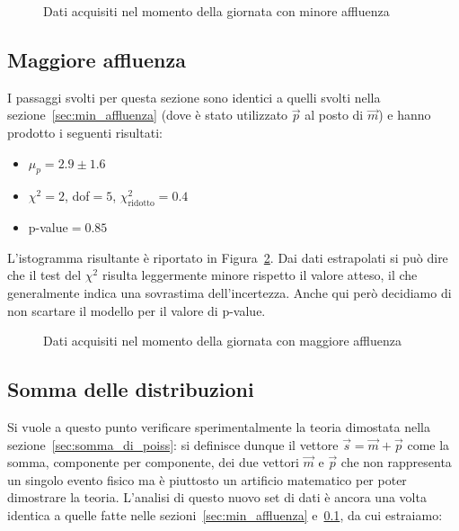 \documentclass[a4paper,12pt]{article}
\begin{document}
\begin{figure}
    \centering
    \sffamily
    \resizebox{0.85\textwidth}{!}{%
        
    }
    \caption{Dati acquisiti nel momento della giornata con minore affluenza}%
    \label{fig:set1}
\end{figure}

\subsection{Maggiore affluenza}\label{sec:max_affluenza}

I passaggi svolti per questa sezione sono identici a quelli svolti nella sezione~\ref{sec:min_affluenza} (dove è stato utilizzato $\vec{p}$ al posto di $\vec{m}$) e hanno prodotto i seguenti risultati:

\begin{itemize}
    \item $\mu_p = 2.9 \pm 1.6$
    \item $\chi^2 = 2$, dof$=5$, $\chi^2_\text{ridotto} = 0.4$
    \item p-value$=0.85$
\end{itemize}

L'istogramma risultante è riportato in Figura~\ref{fig:set2}. Dai dati estrapolati si può dire che il test del $\chi^2$ risulta leggermente minore rispetto il valore atteso, il che generalmente indica una sovrastima dell'incertezza. Anche qui però decidiamo di non scartare il modello per il valore di p-value.

\begin{figure}
    \centering
    \sffamily
    \resizebox{0.85\textwidth}{!}{%
        
    }
    \caption{Dati acquisiti nel momento della giornata con maggiore affluenza}%
    \label{fig:set2}
\end{figure}

\subsection{Somma delle distribuzioni}

Si vuole a questo punto verificare sperimentalmente la teoria dimostata nella sezione~\ref{sec:somma_di_poiss}: si definisce dunque il vettore $\vec{s} = \vec{m} + \vec{p}$ come la somma, componente per componente, dei due vettori $\vec{m}$ e $\vec{p}$ che non rappresenta un singolo evento fisico ma è piuttosto un artificio matematico per poter dimostrare la teoria. L'analisi di questo nuovo set di dati è ancora una volta identica a quelle fatte nelle sezioni~\ref{sec:min_affluenza} e~\ref{sec:max_affluenza}, da cui estraiamo:
\end{document}
